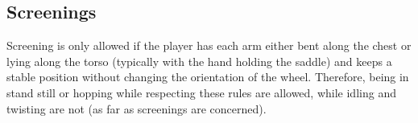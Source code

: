 \subsection{Screenings}
Screening is only allowed if the player has each arm either bent along the chest or lying along the torso (typically with the hand holding the saddle) and keeps a stable position without changing the orientation of the wheel.
Therefore, being in stand still or hopping while respecting these rules are allowed, while idling and twisting are not (as far as screenings are concerned).
